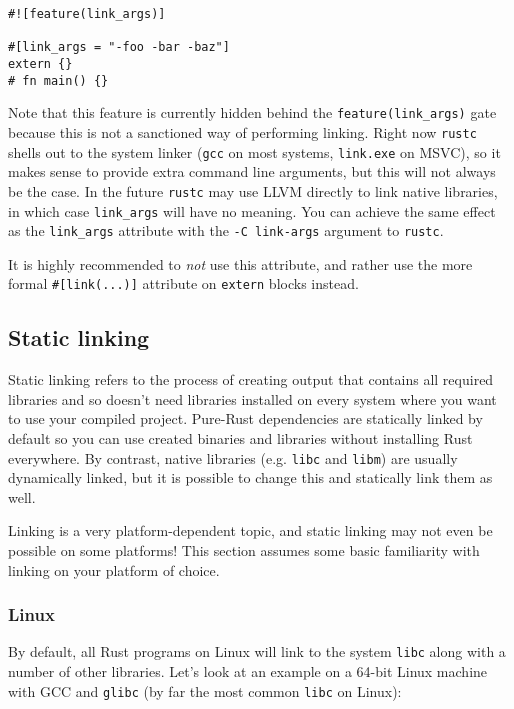 \documentclass[a4paper,]{book}
\begin{document}
\begin{verbatim}
#![feature(link_args)]

#[link_args = "-foo -bar -baz"]
extern {}
# fn main() {}
\end{verbatim}

Note that this feature is currently hidden behind the
\texttt{feature(link\_args)} gate because this is not a sanctioned way
of performing linking. Right now \texttt{rustc} shells out to the system
linker (\texttt{gcc} on most systems, \texttt{link.exe} on MSVC), so it
makes sense to provide extra command line arguments, but this will not
always be the case. In the future \texttt{rustc} may use LLVM directly
to link native libraries, in which case \texttt{link\_args} will have no
meaning. You can achieve the same effect as the \texttt{link\_args}
attribute with the \texttt{-C\ link-args} argument to \texttt{rustc}.

It is highly recommended to \emph{not} use this attribute, and rather
use the more formal \texttt{\#{[}link(...){]}} attribute on
\texttt{extern} blocks instead.

\subsection{Static linking}\label{static-linking}

Static linking refers to the process of creating output that contains
all required libraries and so doesn't need libraries installed on every
system where you want to use your compiled project. Pure-Rust
dependencies are statically linked by default so you can use created
binaries and libraries without installing Rust everywhere. By contrast,
native libraries (e.g. \texttt{libc} and \texttt{libm}) are usually
dynamically linked, but it is possible to change this and statically
link them as well.

Linking is a very platform-dependent topic, and static linking may not
even be possible on some platforms! This section assumes some basic
familiarity with linking on your platform of choice.

\subsubsection{Linux}\label{linux}

By default, all Rust programs on Linux will link to the system
\texttt{libc} along with a number of other libraries. Let's look at an
example on a 64-bit Linux machine with GCC and \texttt{glibc} (by far
the most common \texttt{libc} on Linux):
\end{document}
